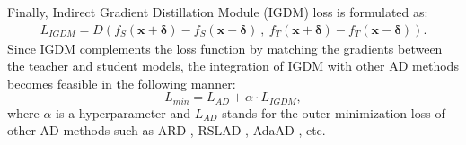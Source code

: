 \documentclass{article} %
\begin{document}
Finally, Indirect Gradient Distillation Module (IGDM) loss is formulated as:
\begin{equation}\label{method6}
\begin{split}
    L_{IGDM} = D\left (f_S(\textbf{x} + \boldsymbol{\delta} ) - f_S(\textbf{x} -  \boldsymbol{\delta} ) 
    \ , \ f_T(\textbf{x} + \boldsymbol{\delta}) - f_T(\textbf{x} -  \boldsymbol{\delta} ) \right ).
\end{split}
\end{equation}
Since IGDM complements the loss function by matching the gradients between the teacher and student models, the integration of IGDM with other AD methods becomes feasible in the following manner:
\begin{equation}\label{method7}
    L_{min} = L_{AD} + \alpha \cdot L_{IGDM},
\end{equation}
where $\alpha$ is a hyperparameter and $L_{AD}$ stands for the outer minimization loss of other AD methods such as ARD \citep{ard}, RSLAD \citep{rslad}, AdaAD \citep{adaad}, etc.







\end{document}
